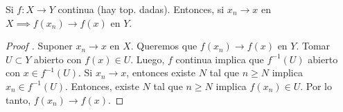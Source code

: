 	\begin{lemma}
		Si $f: X \to Y$ continua (hay top. dadas). Entonces, si $x_n \to x$ en $X \implies f(x_n) \to f(x)$ en $Y$.
	\end{lemma}
	\begin{proof}[Proof ]
		Suponer $x_n \to x$ en $X$. Queremos que $f(x_n) \to f(x)$ en $Y$. Tomar $U \subset Y$ abierto con $f(x) \in U$. Luego, $f$ continua implica que $f^{-1}(U)$ abierto con $x \in f^{-1}(U)$. Si $x_n \to x$, entonces existe $N$ tal que $n\geq N$ implica $x_n \in f^{-1}(U)$. Entonces, existe $N$ tal que $n\geq N$ implica $f(x_n) \in U$. Por lo tanto, $f(x_n) \to f(x)$.
	\end{proof}
